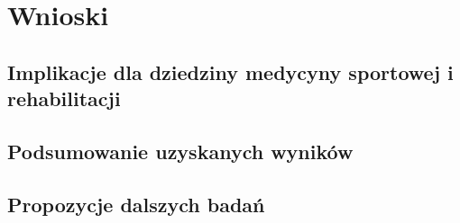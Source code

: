 \chapter{Wnioski}
\section{Implikacje dla dziedziny medycyny sportowej i rehabilitacji}
\section{Podsumowanie uzyskanych wyników}
\section{Propozycje dalszych badań}
